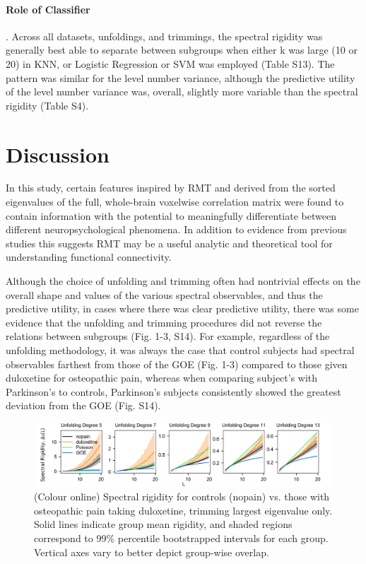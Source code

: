 \documentclass[NETN,manuscript]{stjour-new}
\begin{document}
\paragraph{Role of Classifier}. Across all datasets, unfoldings, and trimmings, the spectral rigidity was
generally best able to separate between subgroups when either k was large (10 or 20) in KNN, or
Logistic Regression or SVM was employed (Table S13). The pattern was similar for the level number
variance, although the predictive utility of the level number variance was, overall, slightly more
variable than the spectral rigidity (Table S4).

\section{Discussion}
In this study, certain features inspired by RMT and derived from the sorted eigenvalues of the full,
whole-brain voxelwise correlation matrix were found to contain information with the potential to
meaningfully differentiate between different neuropsychological phenomena. In addition to evidence
from previous studies
\citep{sebaRandomMatrixAnalysis2003,wangRandomMatrixTheory2016,matharooSpontaneousBackpainAlters2020}
this suggests RMT may be a useful analytic and theoretical tool for understanding functional
connectivity.

Although the choice of unfolding and trimming often had nontrivial effects on the overall shape and
values of the various spectral observables, and thus the predictive utility, in cases where there
was clear predictive utility, there was some evidence that the unfolding and trimming procedures did
not reverse the relations between subgroups (Fig. 1-3, S14). For example, regardless of the
unfolding methodology, it was always the case that control subjects had spectral observables
farthest from those of the GOE (Fig. 1-3) compared to those given duloxetine for osteopathic pain,
whereas when comparing subject's with Parkinson's to controls, Parkinson's subjects consistently
showed the greatest deviation from the GOE (Fig. S14).

\begin{figure}[ht]
\centerline{\includegraphics[width=\textwidth]{figure1}} \caption{
    (Colour online) Spectral rigidity for controls (nopain) vs. those with osteopathic pain taking
    duloxetine, trimming largest eigenvalue only. Solid lines indicate group mean rigidity, and
    shaded regions correspond to 99\% percentile bootstrapped intervals for each group. Vertical
    axes vary to better depict group-wise overlap.}
\label{fig:rigidity}
\end{figure}
\end{document}
